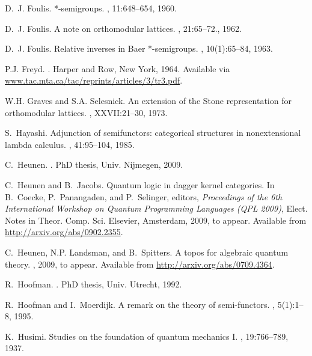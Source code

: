 \documentclass{article}
\begin{document}
\begin{thebibliography}{10}
D.~J. Foulis.
 *-semigroups.
, 11:648--654, 1960.

D.~J. Foulis.
\newblock A note on orthomodular lattices.
, 21:65--72., 1962.

D.~J. Foulis.
\newblock Relative inverses in {Baer} *-semigroups.
, 10(1):65--84, 1963.

P.J. Freyd.
.
\newblock Harper and Row, New York, 1964.
\newblock Available via \url{www.tac.mta.ca/tac/reprints/articles/3/tr3.pdf}.

W.H. Graves and S.A. Selesnick.
\newblock An extension of the {Stone} representation for orthomodular lattices.
, XXVII:21--30, 1973.

S.~Hayashi.
\newblock Adjunction of semifunctors: categorical structures in nonextensional
  lambda calculus.
, 41:95--104, 1985.

C.~Heunen.
.
\newblock PhD thesis, Univ. Nijmegen, 2009.

C.~Heunen and B.~Jacobs.
\newblock Quantum logic in dagger kernel categories.
\newblock In B.~Coecke, P.~Panangaden, and P.~Selinger, editors, {\em
  Proceedings of the 6th International Workshop on Quantum Programming
  Languages (QPL 2009)}, Elect. Notes in Theor. Comp. Sci. Elsevier, Amsterdam,
  2009, to appear.
\newblock Available from \url{http://arxiv.org/abs/0902.2355}.

C.~Heunen, N.P. Landsman, and B.~Spitters.
\newblock A topos for algebraic quantum theory.
, 2009, to appear.
\newblock Available from \url{http://arxiv.org/abs/0709.4364}.

R.~Hoofman.
.
\newblock PhD thesis, Univ. Utrecht, 1992.

R.~Hoofman and I.~Moerdijk.
\newblock A remark on the theory of semi-functors.
, 5(1):1--8, 1995.

K.~Husimi.
\newblock Studies on the foundation of quantum mechanics {I}.
, 19:766--789, 1937.


\end{thebibliography}
\end{document}
